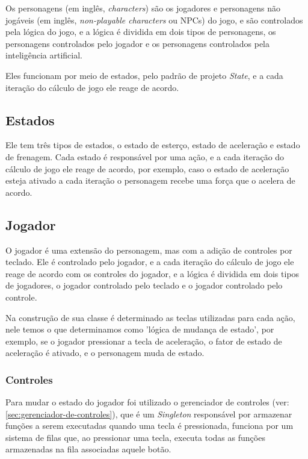 Os personagens (em inglês, \textit{characters}) são os jogadores e personagens não jogáveis (em inglês, \textit{non-playable characters} ou NPCs) do jogo, e são controlados pela lógica do jogo, e a lógica é dividida em dois tipos de personagens, os personagens controlados pelo jogador e os personagens controlados pela inteligência artificial.

Eles funcionam por meio de estados, pelo padrão de projeto \textit{State}, e a cada iteração do cálculo de jogo ele reage de acordo.

\subsection{Estados}

Ele tem três tipos de estados, o estado de esterço, estado de aceleração e estado de frenagem. Cada estado é responsável por uma ação, e a cada iteração do cálculo de jogo ele reage de acordo, por exemplo, caso o estado de aceleração esteja ativado a cada iteração o personagem recebe uma força que o acelera de acordo.

\subsection{Jogador}

O jogador é uma extensão do personagem, mas com a adição de controles por teclado. Ele é controlado pelo jogador, e a cada iteração do cálculo de jogo ele reage de acordo com os controles do jogador, e a lógica é dividida em dois tipos de jogadores, o jogador controlado pelo teclado e o jogador controlado pelo controle.

Na construção de sua classe é determinado as teclas utilizadas para cada ação, nele temos o que determinamos como 'lógica de mudança de estado', por exemplo, se o jogador pressionar a tecla de aceleração, o fator de estado de aceleração é ativado, e o personagem muda de estado.

\subsubsection{Controles}

Para mudar o estado do jogador foi utilizado o gerenciador de controles (ver: \ref{sec:gerenciador-de-controles}), que é um \textit{Singleton} responsável por armazenar funções a serem executadas quando uma tecla é pressionada, funciona por um sistema de filas que, ao pressionar uma tecla, executa todas as funções armazenadas na fila associadas aquele botão.

